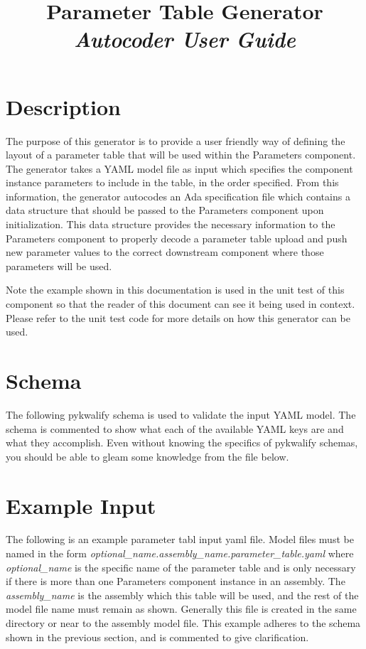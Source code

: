 



\title{\textbf{Parameter Table Generator} \\
\large\textit{Autocoder User Guide}}
\date{}
\maketitle

\section{Description}

The purpose of this generator is to provide a user friendly way of defining the layout of a parameter table that will be used within the Parameters component. The generator takes a YAML model file as input which specifies the component instance parameters to include in the table, in the order specified. From this information, the generator autocodes an Ada specification file which contains a data structure that should be passed to the Parameters component upon initialization. This data structure provides the necessary information to the Parameters component to properly decode a parameter table upload and push new parameter values to the correct downstream component where those parameters will be used.

Note the example shown in this documentation is used in the unit test of this component so that the reader of this document can see it being used in context. Please refer to the unit test code for more details on how this generator can be used.

\section{Schema}

The following pykwalify schema is used to validate the input YAML model. The schema is commented to show what each of the available YAML keys are and what they accomplish. Even without knowing the specifics of pykwalify schemas, you should be able to gleam some knowledge from the file below.


\section{Example Input}

The following is an example parameter tabl input yaml file. Model files must be named in the form \textit{optional\_name.assembly\_name.parameter\_table.yaml} where \textit{optional\_name} is the specific name of the parameter table and is only necessary if there is more than one Parameters component instance in an assembly. The \textit{assembly\_name} is the assembly which this table will be used, and the rest of the model file name must remain as shown. Generally this file is created in the same directory or near to the assembly model file. This example adheres to the schema shown in the previous section, and is commented to give clarification.


